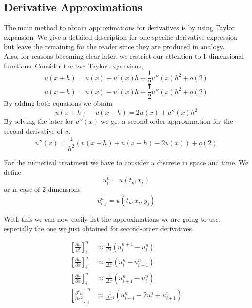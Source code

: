 \documentclass[]{article}
\begin{document}
\subsection{Derivative Approximations} \label{derivate_approx}
The main method to obtain approximations for derivatives is by using Taylor expansion.
We give a detailed description for one specific derivative expression but leave the remaining for the reader since they are produced in analogy.\\
Also, for reasons becoming clear later, we restrict our attention to 1-dimensional functions.
Consider the two Taylor expansions,
\begin{equation*}
u(x+h)=u(x)+u'(x)h+\frac{1}{2}u''(x)h^2+o(2)
\end{equation*}
\begin{equation*}
u(x-h)=u(x)-u'(x)h+\frac{1}{2}u''(x)h^2+o(2)
\end{equation*}
By adding both equations we obtain
\begin{equation*}
u(x+h)+u(x-h)=2u(x)+u''(x)h^2
\end{equation*}
By solving the later for $u''(x)$ we get a second-order approximation for the second derivative
of $u$.
\begin{equation*} 
u''(x)=\frac{1}{h^2}(u(x+h)+u(x-h)-2u(x)) + o(2)
\end{equation*}

For the numerical treatment we have to consider $u$ discrete in space and time.
We define 
\begin{equation*}
u_{i}^{n}=u(t_{n}, x_{i})
\end{equation*}
or in case of 2-dimensions
\begin{equation*}
u_{i,j}^{n}=u(t_{n}, x_{i}, y_{j})
\end{equation*}

With this we can now easily list the approximations we are going to use, especially the one
we just obtained for second-order derivatives.

\begin{eqnarray}
	\left[\frac{\partial u}{\partial t}\right]_{i}^{n} & \approx \frac{1}{\Delta t}(u_{i}^{n+1}-u_{i}^{n}) \nonumber  \\
	\left[\frac{\partial u}{\partial x}\right]_{i}^{n} & \approx \frac{1}{\Delta x}(u_{i}^{n}-u_{i-1}^{n})  \label{backward_in_space} \\
	\left[\frac{\partial u}{\partial x}\right]_{i}^{n} & \approx \frac{1}{\Delta x}(u_{i+1}^{n}-u_{i}^{n}) \label{forward_in_space}  \\
	\left[\frac{\partial^2 u}{\partial x^2}\right]_{i}^{n} & \approx
	\frac{1}{\Delta x^2}(u_{i-1}^{n}-2u_{i}^{n}+u_{i+1}^{n}) \nonumber
\end{eqnarray}
\end{document}

